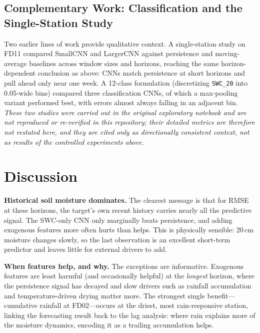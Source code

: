 \documentclass[11pt]{article}
\begin{document}
\subsection{Complementary Work: Classification and the Single-Station Study}

Two earlier lines of work provide qualitative context. A single-station study on
FD11 compared SmallCNN and LargerCNN against persistence and moving-average
baselines across window sizes and horizons, reaching the same horizon-dependent
conclusion as above: CNNs match persistence at short horizons and pull ahead only
near one week. A 12-class formulation (discretizing \texttt{SWC\_20} into
0.05-wide bins) compared three classification CNNs, of which a max-pooling variant
performed best, with errors almost always falling in an adjacent bin.
\emph{These two studies were carried out in the original exploratory notebook and
are not reproduced or re-verified in this repository; their detailed metrics are
therefore not restated here, and they are cited only as directionally consistent
context, not as results of the controlled experiments above.}

\section{Discussion}

\textbf{Historical soil moisture dominates.} The clearest message is that for
RMSE at these horizons, the target's own recent history carries nearly all the
predictive signal. The SWC-only CNN only marginally beats persistence, and adding
exogenous features more often hurts than helps. This is physically sensible:
20\,cm moisture changes slowly, so the last observation is an excellent short-term
predictor and leaves little for external drivers to add.

\textbf{When features help, and why.} The exceptions are informative. Exogenous
features are least harmful (and occasionally helpful) at the \emph{longest}
horizon, where the persistence signal has decayed and slow drivers such as
rainfall accumulation and temperature-driven drying matter more. The strongest
single benefit---cumulative rainfall at FD02---occurs at the driest, most
rain-responsive station, linking the forecasting result back to the lag analysis:
where rain explains more of the moisture dynamics, encoding it as a trailing
accumulation helps.
\end{document}
